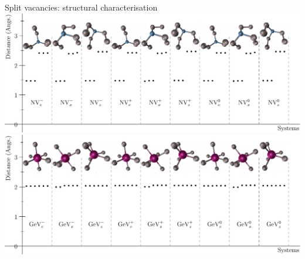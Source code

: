 \documentclass[notes=hide]{beamer}
\begin{document}
\begin{frame}{Split vacancies: structural characterisation}
  \centering
  \includegraphics[height=.5\textheight]{images/split/split_N.pdf}\\
  \includegraphics[height=.5\textheight]{images/split/split_Ge.pdf}
\end{frame}
\end{document}
